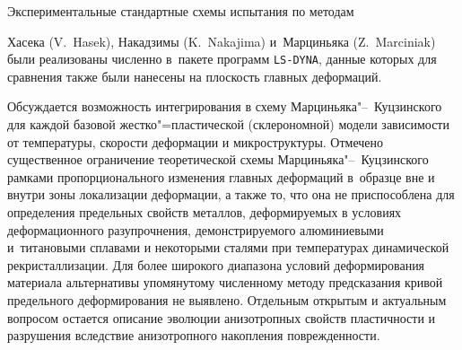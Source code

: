 {Экспериментальные стандартные схемы испытания по методам

Хасека (V.~Hasek), Накадзимы (K.~Nakajima) и~Марциньяка (Z.~Marciniak) были реализованы численно в~пакете программ {\tt LS-DYNA}, данные которых для сравнения также были  нанесены на плоскость главных деформаций. 



Обсуждается возможность интегрирования в схему Марциньяка"--~Куцзинского для каждой базовой жестко"=пластической (склерономной) модели зависимости от температуры, скорости деформации и микроструктуры. Отмечено существенное ограничение теоретической схемы Марциньяка"--~Куцзинского рамками пропорционального изменения главных деформаций в~образце вне и внутри зоны локализации деформации, а также то, что она не приспособлена для определения предельных свойств металлов, деформируемых в условиях деформационного разупрочнения, демонстрируемого алюминиевыми и~титановыми сплавами и некоторыми сталями при температурах динамической рекристаллизации. Для более широкого диапазона условий деформирования материала альтернативы упомянутому численному методу предсказания кривой предельного деформирования не выявлено. Отдельным открытым и актуальным вопросом остается описание эволюции анизотропных свойств пластичности и разрушения вследствие анизотропного накопления поврежденности.

	}



